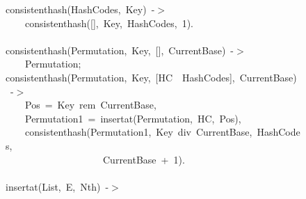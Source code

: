 \documentclass[runningheads,a4paper]{llncs}
\newcommand{\hlstd}[1]{\textcolor[rgb]{0,0,0}{#1}}
\newcommand{\hlnum}[1]{\textcolor[rgb]{0.69,0.49,0}{#1}}
\newcommand{\hlopt}[1]{\textcolor[rgb]{0,0,0}{#1}}
\newcommand{\hlkwd}[1]{\textcolor[rgb]{0,0,0.51}{#1}}
\begin{document}
\begin{figure}
\noindent
\ttfamily
\hlkwd{consistent\textunderscore hash}\hlstd{}\hlopt{(}\hlstd{HashCodes}\hlopt{,\ }\hlstd{Key}\hlopt{)\ {-}$>$}\hspace*{\fill}\\
\hlstd{}\hlstd{\ \ \ \ }\hlstd{}\hlkwd{consistent\textunderscore hash}\hlstd{}\hlopt{({[}{]},\ }\hlstd{Key}\hlopt{,\ }\hlstd{HashCodes}\hlopt{,\ }\hlstd{}\hlnum{1}\hlstd{}\hlopt{).}\hspace*{\fill}\\
\hlstd{}\hspace*{\fill}\\
\hlkwd{consistent\textunderscore hash}\hlstd{}\hlopt{(}\hlstd{Permutation}\hlopt{,\ }\hlstd{\textunderscore Key}\hlopt{,\ {[}{]},\ }\hlstd{\textunderscore CurrentBase}\hlopt{)\ {-}$>$}\hspace*{\fill}\\
\hlstd{}\hlstd{\ \ \ \ }\hlstd{Permutation}\hlopt{;}\hspace*{\fill}\\
\hlstd{}\hlkwd{consistent\textunderscore hash}\hlstd{}\hlopt{(}\hlstd{Permutation}\hlopt{,\ }\hlstd{Key}\hlopt{,\ {[}}\hlstd{HC\ \textbar \ HashCodes}\hlopt{{]},\ }\hlstd{CurrentBase}\hlopt{)\ {-}$>$}\hspace*{\fill}\\
\hlstd{}\hlstd{\ \ \ \ }\hlstd{Pos\ }\hlopt{=\ }\hlstd{Key\ rem\ CurrentBase}\hlopt{,}\hspace*{\fill}\\
\hlstd{}\hlstd{\ \ \ \ }\hlstd{Permutation1\ }\hlopt{=\ }\hlstd{}\hlkwd{insert\textunderscore at}\hlstd{}\hlopt{(}\hlstd{Permutation}\hlopt{,\ }\hlstd{HC}\hlopt{,\ }\hlstd{Pos}\hlopt{),}\hspace*{\fill}\\
\hlstd{}\hlstd{\ \ \ \ }\hlstd{}\hlkwd{consistent\textunderscore hash}\hlstd{}\hlopt{(}\hlstd{Permutation1}\hlopt{,\ }\hlstd{Key\ div\ CurrentBase}\hlopt{,\ }\hlstd{HashCodes}\hlopt{,}\hspace*{\fill}\\
\hlstd{}\hlstd{\ \ \ \ \ \ \ \ \ \ \ \ \ \ \ \ \ \ \ \ }\hlstd{CurrentBase\ }\hlopt{+\ }\hlstd{}\hlnum{1}\hlstd{}\hlopt{).}\hspace*{\fill}\\
\hlstd{}\hspace*{\fill}\\
\hlkwd{insert\textunderscore at}\hlstd{}\hlopt{(}\hlstd{List}\hlopt{,\ }\hlstd{E}\hlopt{,\ }\hlstd{Nth}\hlopt{)\ {-}$>$}\hspace*{\fill}\\

\end{figure}
\end{document}
